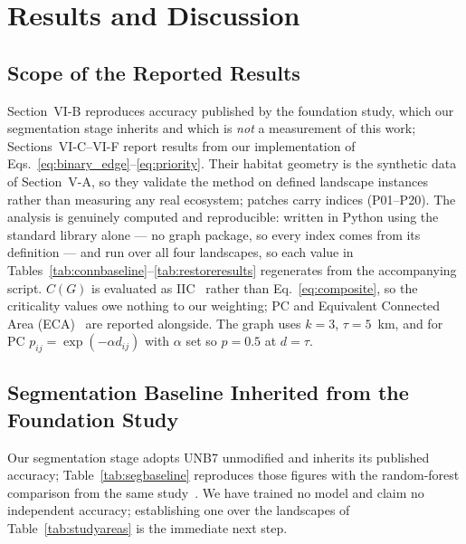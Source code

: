 \documentclass[conference]{IEEEtran}
\begin{document}
\section{Results and Discussion}

\subsection{Scope of the Reported Results}

Section~VI-B reproduces accuracy published by the foundation study, which our segmentation stage inherits and which is \emph{not} a measurement of this work; Sections~VI-C--VI-F report results from our implementation of Eqs.~\eqref{eq:binary_edge}--\eqref{eq:priority}. Their habitat geometry is the synthetic data of Section~V-A, so they validate the method on defined landscape instances rather than measuring any real ecosystem; patches carry indices (P01--P20). The analysis is genuinely computed and reproducible: written in Python using the standard library alone --- no graph package, so every index comes from its definition --- and run over all four landscapes, so each value in Tables~\ref{tab:connbaseline}--\ref{tab:restoreresults} regenerates from the accompanying script. $C(G)$ is evaluated as IIC~\cite{pascualhortal2006comparison} rather than Eq.~\eqref{eq:composite}, so the criticality values owe nothing to our weighting; PC and Equivalent Connected Area (ECA)~\cite{saura2007habitat} are reported alongside. The graph uses $k = 3$, $\tau = 5$~km, and for PC $p_{ij} = \exp(-\alpha d_{ij})$ with $\alpha$ set so $p = 0.5$ at $d = \tau$.

\subsection{Segmentation Baseline Inherited from the Foundation Study}

Our segmentation stage adopts UNB7 unmodified and inherits its published accuracy; Table~\ref{tab:segbaseline} reproduces those figures with the random-forest comparison from the same study~\cite{ghorbanian2025mangrove}. We have trained no model and claim no independent accuracy; establishing one over the landscapes of Table~\ref{tab:studyareas} is the immediate next step.
\end{document}
